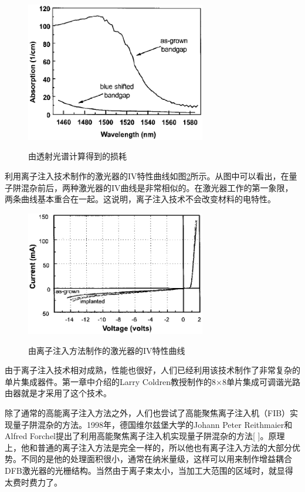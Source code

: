 \documentclass{ZJUthesis}
\begin{document}
\begin{figure}[!ht]
  \centering
  \includegraphics[width=0.7\textwidth]{./Pictures/implantation_wg_loss.eps}\\
  \caption{由透射光谱计算得到的损耗}
  \label{fig_implantation_wg_loss}
\end{figure}

利用离子注入技术制作的激光器的IV特性曲线如图\ref{fig_implantation_laser}所示。从图中可以看出，在量子阱混杂前后，两种激光器的IV曲线是非常相似的。在激光器工作的第一象限，两条曲线基本重合在一起。这说明，离子注入技术不会改变材料的电特性。

\begin{figure}[!ht]
  \centering
  \includegraphics[width=0.7\textwidth]{./Pictures/implantation_laser.eps}\\
  \caption{由离子注入方法制作的激光器的IV特性曲线}
  \label{fig_implantation_laser}
\end{figure}

由于离子注入技术相对成熟，性能也很好，人们已经利用该技术制作了非常复杂的单片集成器件。第一章中介绍的Larry Coldren教授制作的8×8单片集成可调谐光路由器就是才采用了这个技术。

除了通常的高能离子注入方法之外，人们也尝试了高能聚焦离子注入机（FIB）实现量子阱混杂的方法。1998年，德国维尔兹堡大学的Johann Peter Reithmaier和Alfred Forchel提出了利用高能聚焦离子注入机实现量子阱混杂的方法[ ]。原理上，他和普通的离子注入方法是完全一样的，所以他也有离子注入方法的大部分优势。不同的是他的处理面积很小，通常在纳米量级，这样可以用来制作增益耦合DFB激光器的光栅结构。当然由于离子束太小，当加工大范围的区域时，就显得太费时费力了。
\end{document}
